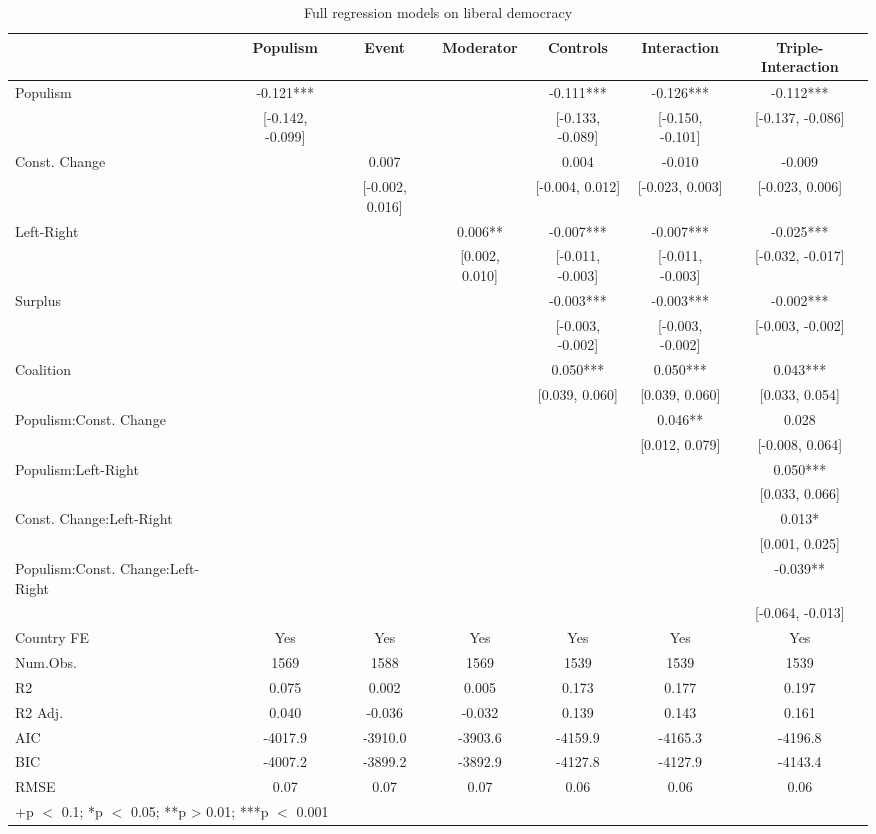 \documentclass[
  abstract]{article}
\begin{document}
\hypertarget{tbl-libdem}{}
\begin{table}
\caption{\label{tbl-libdem}Full regression models on liberal democracy }\tabularnewline

\centering\centering\centering
\begin{tabular}[t]{lcccccc}
\toprule
  & Populism & Event & Moderator & Controls & Interaction & Triple-Interaction\\
\midrule
Populism & -0.121*** &  &  & -0.111*** & -0.126*** & -0.112***\\
 & {}[-0.142, -0.099] &  &  & {}[-0.133, -0.089] & {}[-0.150, -0.101] & {}[-0.137, -0.086]\\
Const. Change &  & 0.007 &  & 0.004 & -0.010 & -0.009\\
 &  & {}[-0.002, 0.016] &  & {}[-0.004, 0.012] & {}[-0.023, 0.003] & {}[-0.023, 0.006]\\
Left-Right &  &  & 0.006** & -0.007*** & -0.007*** & -0.025***\\
 &  &  & {}[0.002, 0.010] & {}[-0.011, -0.003] & {}[-0.011, -0.003] & {}[-0.032, -0.017]\\
Surplus &  &  &  & -0.003*** & -0.003*** & -0.002***\\
 &  &  &  & {}[-0.003, -0.002] & {}[-0.003, -0.002] & {}[-0.003, -0.002]\\
Coalition &  &  &  & 0.050*** & 0.050*** & 0.043***\\
 &  &  &  & {}[0.039, 0.060] & {}[0.039, 0.060] & {}[0.033, 0.054]\\
Populism:Const. Change &  &  &  &  & 0.046** & 0.028\\
 &  &  &  &  & {}[0.012, 0.079] & {}[-0.008, 0.064]\\
Populism:Left-Right &  &  &  &  &  & 0.050***\\
 &  &  &  &  &  & {}[0.033, 0.066]\\
Const. Change:Left-Right &  &  &  &  &  & 0.013*\\
 &  &  &  &  &  & {}[0.001, 0.025]\\
Populism:Const. Change:Left-Right &  &  &  &  &  & -0.039**\\
 &  &  &  &  &  & {}[-0.064, -0.013]\\
\midrule
Country FE & Yes & Yes & Yes & Yes & Yes & Yes\\
Num.Obs. & 1569 & 1588 & 1569 & 1539 & 1539 & 1539\\
R2 & 0.075 & 0.002 & 0.005 & 0.173 & 0.177 & 0.197\\
R2 Adj. & 0.040 & -0.036 & -0.032 & 0.139 & 0.143 & 0.161\\
AIC & -4017.9 & -3910.0 & -3903.6 & -4159.9 & -4165.3 & -4196.8\\
BIC & -4007.2 & -3899.2 & -3892.9 & -4127.8 & -4127.9 & -4143.4\\
RMSE & 0.07 & 0.07 & 0.07 & 0.06 & 0.06 & 0.06\\
\bottomrule
\multicolumn{7}{l}{\rule{0pt}{1em}+p $<$ 0.1; *p $<$ 0.05; **p > 0.01; ***p $<$ 0.001}\\
\end{tabular}
\end{table}
\end{document}
